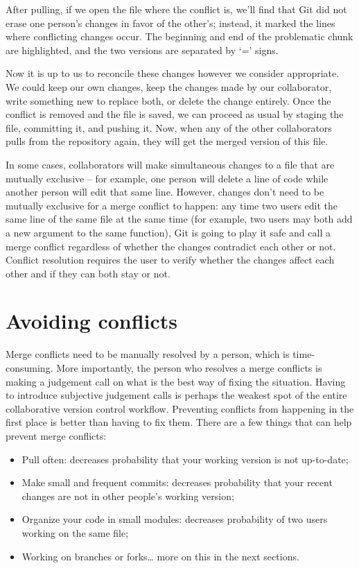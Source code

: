 \documentclass[
]{book}
\providecommand{\tightlist}{%
  \setlength{\itemsep}{0pt}\setlength{\parskip}{0pt}}
\begin{document}
After pulling, if we open the file where the conflict is, we'll find that Git did not erase one person's changes in favor of the other's; instead, it marked the lines where conflicting changes occur. The beginning and end of the problematic chunk are highlighted, and the two versions are separated by `=' signs.

Now it is up to us to reconcile these changes however we consider appropriate. We could keep our own changes, keep the changes made by our collaborator, write something new to replace both, or delete the change entirely. Once the conflict is removed and the file is saved, we can proceed as usual by staging the file, committing it, and pushing it. Now, when any of the other collaborators pulls from the repository again, they will get the merged version of this file.

In some cases, collaborators will make simultaneous changes to a file that are mutually exclusive -- for example, one person will delete a line of code while another person will edit that same line. However, changes don't need to be mutually exclusive for a merge conflict to happen: any time two users edit the same line of the same file at the same time (for example, two users may both add a new argument to the same function), Git is going to play it safe and call a merge conflict regardless of whether the changes contradict each other or not. Conflict resolution requires the user to verify whether the changes affect each other and if they can both stay or not.

\hypertarget{avoiding-conflicts}{%
\section{Avoiding conflicts}\label{avoiding-conflicts}}

Merge conflicts need to be manually resolved by a person, which is time-consuming. More importantly, the person who resolves a merge conflicts is making a judgement call on what is the best way of fixing the situation. Having to introduce subjective judgement calls is perhaps the weakest spot of the entire collaborative version control workflow. Preventing conflicts from happening in the first place is better than having to fix them. There are a few things that can help prevent merge conflicts:

\begin{itemize}
\tightlist
\item
  Pull often: decreases probability that your working version is not up-to-date;
\item
  Make small and frequent commits: decreases probability that your recent changes are not in other people's working version;
\item
  Organize your code in small modules: decreases probability of two users working on the same file;
\item
  Working on branches or forks\ldots{} more on this in the next sections.
\end{itemize}
\end{document}
